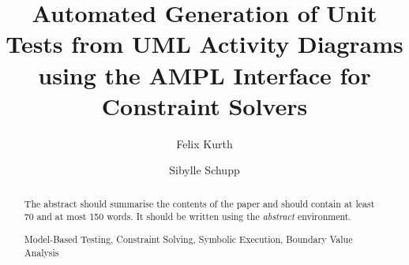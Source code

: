 \documentclass[runningheads,a4paper]{llncs}
\newcommand{\keywords}[1]{\par\addvspace\baselineskip
\noindent\keywordname\enspace\ignorespaces#1}
\begin{document}
\mainmatter  %

\title{Automated Generation of Unit Tests from UML Activity Diagrams using the AMPL Interface for Constraint Solvers}


%
%
\author{Felix Kurth%
\and Sibylle Schupp}
%


%
%

\maketitle%

\begin{abstract}
The abstract should summarise the contents of the paper and should
contain at least 70 and at most 150 words. It should be written using the
\emph{abstract} environment.
\keywords{Model-Based Testing, Constraint Solving, Symbolic Execution, Boundary Value Analysis}
\end{abstract}
\end{document}
